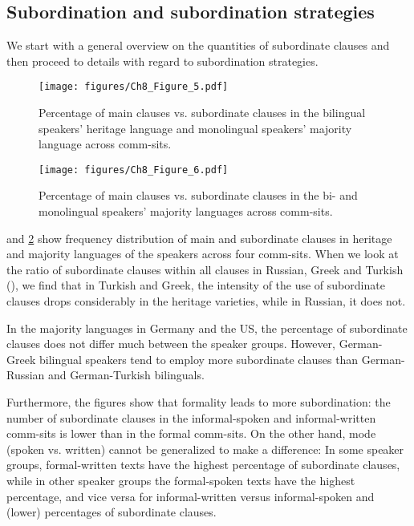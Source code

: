 \documentclass[output=paper,colorlinks,citecolor=brown]{langscibook}
\begin{document}
\subsection{Subordination and subordination strategies} \label{sec:schroederetal:3.2}
We start with a general overview on the quantities of subordinate clauses and then proceed to details with regard to subordination strategies.

\begin{figure}
    \centering
    \texttt{[image: figures/Ch8\_Figure\_5.pdf]}
    \caption{Percentage of main clauses vs. subordinate clauses in the bilingual speakers’ heritage language and monolingual speakers’ majority language across comm-sits.}
    \label{fig:schroederetal:5}
\end{figure}

\begin{figure}
    \centering
    \texttt{[image: figures/Ch8\_Figure\_6.pdf]}
    \caption{Percentage of main clauses vs. subordinate clauses in the bi- and monolingual speakers’ majority languages across comm-sits.}
    \label{fig:schroederetal:6}
\end{figure}

 and \ref{fig:schroederetal:6} show frequency distribution of main and subordinate clauses in heritage and majority languages of the speakers across four comm-sits. When we look at the ratio of subordinate clauses within all clauses in Russian, Greek and Turkish (), we find that in Turkish and Greek, the intensity of the use of subordinate clauses drops considerably in the heritage varieties, while in Russian, it does not.

In the majority languages in Germany and the US, the percentage of subordinate clauses does not differ much between the speaker groups. However, German-Greek bilingual speakers tend to employ more subordinate clauses than German-Russian and German-Turkish bilinguals.

Furthermore, the figures show that formality leads to more subordination: the number of subordinate clauses in the informal-spoken and informal-written comm-sits is lower than in the formal comm-sits. On the other hand, mode (spoken vs. written) cannot be generalized to make a difference: In some speaker groups, formal-written texts have the highest percentage of subordinate clauses, while in other speaker groups the formal-spoken texts have the highest percentage, and vice versa for informal-written versus informal-spoken and (lower) percentages of subordinate clauses. 
\end{document}
